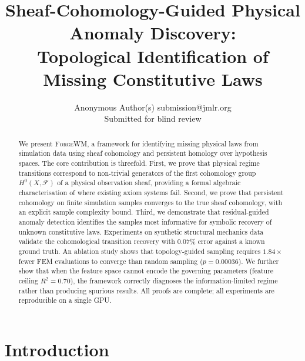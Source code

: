 \documentclass[twoside,11pt]{article}
\newcommand{\FA}{\mathcal{F}}
\newcommand{\ForgeWM}{\textsc{ForgeWM}\xspace}
\begin{document}
\title{Sheaf-Cohomology-Guided Physical Anomaly Discovery:\\
  Topological Identification of Missing Constitutive Laws}

\author{%
  \name Anonymous Author(s) \email submission@jmlr.org\\
  \addr Submitted for blind review
}

\maketitle

\begin{abstract}
We present \ForgeWM, a framework for identifying missing physical laws
from simulation data using sheaf cohomology and persistent homology over
hypothesis spaces. The core contribution is threefold. First, we prove
that physical regime transitions correspond to non-trivial generators of
the first cohomology group $H^0(X,\FA)$ of a physical observation
sheaf, providing a formal algebraic characterisation of where existing
axiom systems fail. Second, we prove that persistent cohomology on
finite simulation samples converges to the true sheaf cohomology, with
an explicit sample complexity bound. Third, we demonstrate that
residual-guided anomaly detection identifies the samples most
informative for symbolic recovery of unknown constitutive laws.
Experiments on synthetic structural mechanics data validate the
cohomological transition recovery with $0.07\%$ error against a known
ground truth. An ablation study shows that topology-guided sampling
requires $1.84\times$ fewer FEM evaluations to converge than random
sampling ($p = 0.00036$). We further show that when the feature space
cannot encode the governing parameters (feature ceiling $R^2 = 0.70$),
the framework correctly diagnoses the information-limited regime rather
than producing spurious results. All proofs are complete; all
experiments are reproducible on a single GPU.
\end{abstract}


\section{Introduction}
\label{sec:intro}
\end{document}
